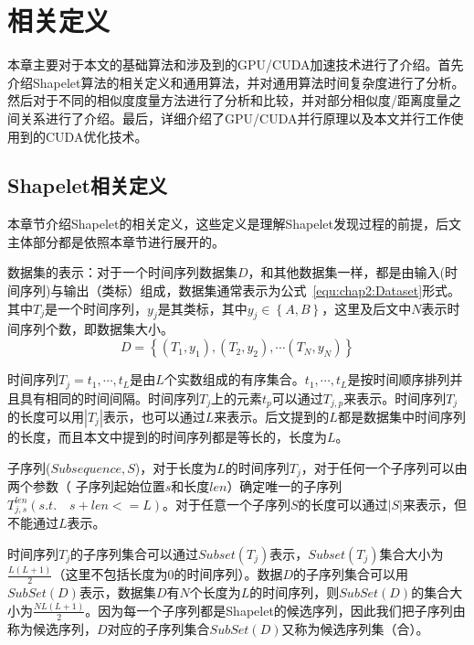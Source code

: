 \chapter{相关定义}
\label{cha:chap02}

本章主要对于本文的基础算法和涉及到的GPU/CUDA加速技术进行了介绍。首先介绍Shapelet算法的相关定义和通用算法，并对通用算法时间复杂度进行了分析。然后对于不同的相似度度量方法进行了分析和比较，并对部分相似度/距离度量之间关系进行了介绍。最后，详细介绍了GPU/CUDA并行原理以及本文并行工作使用到的CUDA优化技术。


\section{Shapelet相关定义}
\label{cha:chap02:def}
本章节介绍Shapelet的相关定义\cite{ye2009time}，这些定义是理解Shapelet发现过程的前提，后文主体部分都是依照本章节进行展开的。
\begin{definition}
	数据集的表示：对于一个时间序列数据集$D$，和其他数据集一样，都是由输入(时间序列)与输出（类标）组成，数据集通常表示为公式~\ref{equ:chap2:Dataset}形式。其中$T_j$是一个时间序列，$y_j$是其类标，其中$y_j\in\left\lbrace A,B\right\rbrace $，这里及后文中$N$表示时间序列个数，即数据集大小。
	\begin{equation}
	\label{equ:chap2:Dataset}
	D = \left\lbrace (T_1,y_1),(T_2,y_2),\cdots (T_N,y_N)\right\rbrace 
	\end{equation}
\end{definition}
\begin{definition}
	时间序列$T_j=t_1,\cdots,t_L$是由$L$个实数组成的有序集合。$t_1,\cdots,t_L$是按时间顺序排列并且具有相同的时间间隔。时间序列$T_j$上的元素$t_p$可以通过$T_{j,p}$来表示。时间序列$T_j$的长度可以用$|T_j|$表示，也可以通过$L$来表示。后文提到的$L$都是数据集中时间序列的长度，而且本文中提到的时间序列都是等长的，长度为$L$。
\end{definition}
\begin{definition}
\label{def:chap02:Subsequence}
	子序列($Subsequence,S$)，对于长度为$L$的时间序列$T_j$，对于任何一个子序列可以由两个参数（ 子序列起始位置$s$和长度$len$）确定唯一的子序列$T_{j,s}^{len}(s.t.\quad s+len <= L)$。对于任意一个子序列$S$的长度可以通过$|S|$来表示，但不能通过$L$表示。
	
	时间序列$T_j$的子序列集合可以通过$Subset(T_j)$表示，$Subset(T_j)$集合大小为$\frac{L(L+1)}{2}$（这里不包括长度为0的时间序列）。数据$D$的子序列集合可以用$SubSet(D)$表示，数据集$D$有$N$个长度为$L$的时间序列，则$SubSet(D)$的集合大小为$\frac{NL(L+1)}{2}$。因为每一个子序列都是Shapelet的候选序列，因此我们把子序列由称为候选序列，$D$对应的子序列集合$SubSet(D)$又称为候选序列集（合）。
\end{definition}

